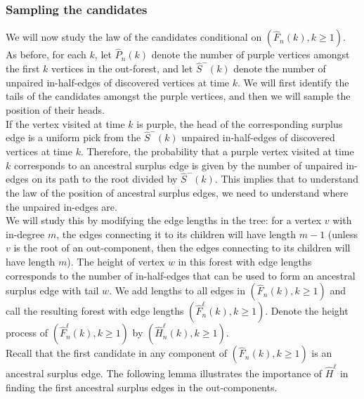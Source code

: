 \subsubsection{Sampling the candidates}\label{subsubsec.samplecandidates}
We will now study the law of the candidates conditional on $(\hat{F}_n(k),k\geq 1)$. As before, for each $k$, let $\hat{P}_n(k)$ denote the number of purple vertices amongst the first $k$ vertices in the out-forest, and let $\hat{S}^-(k)$ denote the number of unpaired in-half-edges of discovered vertices at time $k$. We will first identify the tails of the candidates amongst the purple vertices, and then we will sample the position of their heads. \\
If the vertex visited at time $k$ is purple, the head of the corresponding surplus edge is a uniform pick from the $\hat{S}^-(k)$ unpaired in-half-edges of discovered vertices at time $k$. Therefore, the probability that a purple vertex visited at time $k$ corresponds to an ancestral surplus edge is given by the number of unpaired in-edges on its path to the root divided by $\hat{S}^-(k)$. This implies that to understand the law of the position of ancestral surplus edges, we need to understand where the unpaired in-edges are. \\
We will study this by modifying the edge lengths in the tree: for a vertex $v$ with in-degree $m$, the edges connecting it to its children will have length $m-1$ (unless $v$ is the root of an out-component, then the edges connecting to its children will have length $m$). The height of vertex $w$ in this forest with edge lengths corresponds to the number of in-half-edges that can be used to form an ancestral surplus edge with tail $w$. We add lengths to all edges in $(\hat{F}_n(k),k\geq 1)$ and call the resulting forest with edge lengths $(\hat{F}^\ell_n(k),k\geq 1)$. Denote the height process of $(\hat{F}^\ell_n(k),k\geq 1)$ by $(\hat{H}_n^\ell(k),k\geq 1)$. \\
Recall that the first candidate in any component of $(\hat{F}_n(k),k\geq 1)$ is an ancestral surplus edge. The following lemma illustrates the importance of $\hat{H}^\ell$ in finding the first ancestral surplus edges in the out-components.

